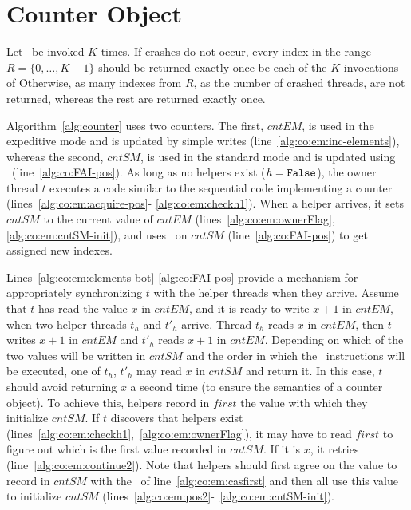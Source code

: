 \section{Counter Object}
\label{sec:counter-object}

Let \NextIndex\ be invoked $K$ times.
If crashes do not occur, every index in the range $R = 
\{0, \ldots, K-1\}$ should be returned exactly once 
be each of the $K$ invocations of \NextIndex\.
Otherwise, as many indexes from $R$, as the number of crashed threads, 
are not returned, whereas the rest are returned exactly once.

Algorithm~\ref{alg:counter} uses two counters. The first, $\mathit{cntEM}$,
is used in the expeditive mode and is updated by simple writes
(line~\ref{alg:co:em:inc-elements}),
whereas the second, $\mathit{cntSM}$, is used in the standard mode and
is updated using \FAI\ (line~\ref{alg:co:FAI-pos}).
As long as no helpers exist ($\mathit{h = \mbox{\texttt{False}}}$), the owner thread $t$ executes 
a code similar to the sequential code implementing a counter (lines~\ref{alg:co:em:acquire-pos}-
\ref{alg:co:em:checkh1}). When a helper arrives, it sets $\mathit{cntSM}$ to the current
value of $cntEM$ (lines~\ref{alg:co:em:ownerFlag}, \ref{alg:co:em:cntSM-init}),
and uses \FAI\ on $\mathit{cntSM}$ (line~\ref{alg:co:FAI-pos}) to get assigned new indexes. 

Lines~\ref{alg:co:em:elements-bot}-\ref{alg:co:FAI-pos} provide a mechanism for appropriately
synchronizing $t$ with the helper threads when they arrive. Assume that $t$ has read the
value $x$ in $\mathit{cntEM}$, and it is ready to write $x+1$ in $\mathit{cntEM}$,
when two helper threads $t_h$ and $t'_h$ arrive.
Thread $t_h$ reads $x$ in $\mathit{cntEM}$, then $t$ writes $x+1$ 
in $\mathit{cntEM}$ and $t'_h$ reads  $x+1$ in $\mathit{cntEM}$.
Depending on which of the two values will be written in $\mathit{cntSM}$
and the order in which the \FAI\ instructions will be executed, 
one of $t_h$, $t'_h$ may read $x$ in $\mathit{cntSM}$ and return it.
% 
In this case, $t$ should avoid returning $x$ a second time (to ensure the semantics of
a counter object). To achieve this, helpers record in $\mathit{first}$ the value with
which they initialize $\mathit{cntSM}$. 
% 
If $t$ discovers that helpers exist (lines~\ref{alg:co:em:checkh1},~\ref{alg:co:em:ownerFlag}), 
it may have to read $\mathit{first}$ to figure out which is the first value recorded
in $\mathit{cntSM}$. If it is $x$, it  retries
(line~\ref{alg:co:em:continue2}). Note that helpers should first agree on the value 
to record in $\mathit{cntSM}$ with the \CAS\ of line~\ref{alg:co:em:casfirst} and then all 
use this value to initialize $\mathit{cntSM}$ (lines~\ref{alg:co:em:pos2}-~\ref{alg:co:em:cntSM-init}).


